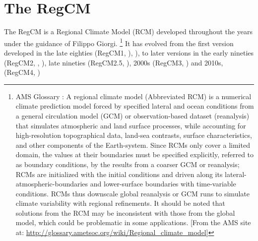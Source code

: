 
\chapter{The \ac{RegCM}}

The \ac{RegCM} is a Regional Climate Model (RCM) developed throughout the
years under the guidance of Filippo Giorgi.
\footnote{AMS Glossary : A regional climate model (Abbreviated RCM) is a
numerical climate prediction model forced by specified lateral and ocean
conditions from a general circulation model (GCM) or observation-based
dataset (reanalysis) that simulates atmospheric and land surface processes,
while accounting for high-resolution topographical data, land-sea contrasts,
surface characteristics, and other components of the Earth-system.
Since RCMs only cover a limited domain, the values at their boundaries
must be specified explicitly, referred to as boundary conditions, by the
results from a coarser GCM or reanalysis; RCMs are initialized with the
initial conditions and driven along its lateral-atmospheric-boundaries and
lower-surface boundaries with time-variable conditions.
RCMs thus downscale global reanalysis or GCM runs to simulate climate
variability with regional refinements. It should be noted that solutions
from the RCM may be inconsistent with those from the global model, which
could be problematic in some applications. [From the AMS site at:
\url{http://glossary.ametsoc.org/wiki/Regional_climate_model}]}
It has evolved from the first version developed in the late eighties
(\ac{RegCM}1, \cite{Dickinson_89}), \cite{Giorgi_90}), to later
versions in the early nineties (\ac{RegCM}2, \cite{Giorgi_93b},
\cite{Giorgi_93c}), late nineties (\ac{RegCM}2.5, \cite{Giorgi_99}),
2000s (\ac{RegCM}3, \cite{Pal_00}) and 2010s,
(\ac{RegCM}4, \cite{Giorgi_13})

